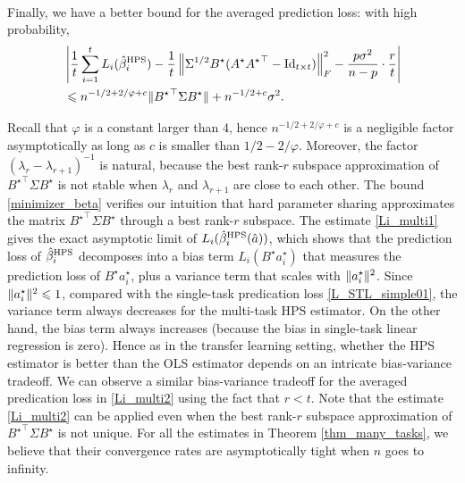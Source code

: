 \begin{theorem}
\begin{align}
	\end{align}
Finally, we have a better bound for the averaged prediction loss:  with high probability,
\begin{align}
&\left|\frac{1}{t}\sum_{i=1}^t L_i(\hat{\beta}_i^{\MTL}) - \frac1t\bignorm{\Sigma^{1/2} B^{\star} (A^\star {A^\star}^{\top} - \id_{t\times t})}_F^2 - \frac{p \sigma^2}{n-p}\cdot \frac{r}{t}  \right| \nonumber \\
 &\le n^{-1/2+2/\varphi+c}  \norm{{B^\star}^\top\Sigma B^\star}+ n^{-1/2+c}   \sigma^2 .\label{Li_multi2}
\end{align}

\end{theorem}

Recall that $\varphi$ is a constant larger than 4, hence $n^{-1/2+2/\varphi+c}$ is a negligible  factor asymptotically as long as $c$ is smaller than $1/2-2/\varphi$. Moreover, the factor $(\lambda_r - \lambda_{r+1})^{-1}$ is natural, because the best rank-$r$ subspace approximation of ${B^{\star}}^\top\Sigma B^{\star}$ is not stable when $\lambda_r $ and $\lambda_{r+1} $ are close to each other.  The bound \eqref{minimizer_beta} verifies our intuition that hard parameter sharing approximates the matrix ${B^{\star}}^\top\Sigma B^{\star}$ through a best rank-$r$ subspace. The estimate \eqref{Li_multi1}
 gives the exact asymptotic limit of $L_i(\hat{\beta}_i^{\textup{HPS}}(\hat a))$, which shows that the prediction loss of $\hat{\beta}_i^{\textup{HPS}}$ decomposes into a bias term $L_i(B^{\star} a_i^{\star})$ that measures the prediction loss of $B^{\star} a_i^{\star}$, plus a variance term that scales with $\|a_i^{\star}\|^2$. Since $\|a_i^{\star}\|^2\leqslant 1$, compared with the single-task predication loss \eqref{L_STL_simple01}, the variance term always decreases for the multi-task HPS estimator. On the other hand, the bias term always increases (because the bias in single-task linear regression is zero). Hence as in the transfer learning setting, whether the HPS estimator is better than the OLS estimator depends on an intricate  {bias-variance tradeoff}.
We can observe a similar {bias-variance tradeoff} for the averaged predication loss in \eqref{Li_multi2} using the fact that $r<t$. Note that the estimate \eqref{Li_multi2} can be applied even when the best rank-$r$ subspace approximation of ${B^{\star}}^\top\Sigma B^{\star}$ is not unique. For all the estimates in Theorem \ref{thm_many_tasks}, we believe that their convergence rates are asymptotically tight when $n$ goes to infinity.


